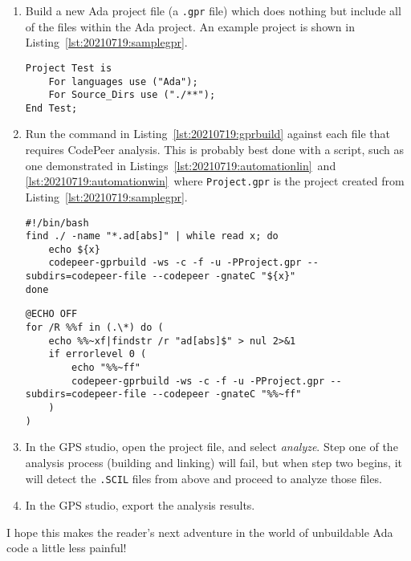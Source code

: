 \begin{enumerate}
	\item Build a new Ada project file (a \texttt{.gpr} file) which does nothing but include all of the files within the Ada project. An example project is shown in Listing~\ref{lst:20210719:samplegpr}.
\begin{lstlisting}[caption={All-Inclusive GPR Example},captionpos=b,style=AdaStyle,basicstyle=\small,label={lst:20210719:samplegpr},literate=*{-}{-}1,breaklines=true,upquote=true]
Project Test is
	For languages use ("Ada");
	For Source_Dirs use ("./**");
End Test;
\end{lstlisting}
	\item Run the command in Listing~\ref{lst:20210719:gprbuild} against each file that requires CodePeer analysis. This is probably best done with a script, such as one demonstrated in Listings~\ref{lst:20210719:automationlin}\ and \ref{lst:20210719:automationwin}\ where \texttt{Project.gpr} is the project created from Listing~\ref{lst:20210719:samplegpr}.
\begin{lstlisting}[caption={Bash Script for Ada Single-Build Automation},captionpos=b,style=BashStyle,basicstyle=\small,label={lst:20210719:automationlin},literate=*{-}{-}1
{"}{"}1,breaklines=true]
#!/bin/bash
find ./ -name "*.ad[abs]" | while read x; do
	echo ${x}
	codepeer-gprbuild -ws -c -f -u -PProject.gpr --subdirs=codepeer-file --codepeer -gnateC "${x}"
done
\end{lstlisting}
\begin{lstlisting}[caption={Batch Script for Ada Single-Build Automation},captionpos=b,style=BashStyle,basicstyle=\small,label={lst:20210719:automationwin},literate=*{-}{-}1
{"}{"}1,breaklines=true]
@ECHO OFF
for /R %%f in (.\*) do (
	echo %%~xf|findstr /r "ad[abs]$" > nul 2>&1
	if errorlevel 0 (
		echo "%%~ff"
		codepeer-gprbuild -ws -c -f -u -PProject.gpr --subdirs=codepeer-file --codepeer -gnateC "%%~ff"
	)
)
\end{lstlisting}
	\item In the GPS studio, open the project file, and select \textit{analyze}.  Step one of the analysis process (building and linking) will fail, but when step two begins, it will detect the \texttt{.SCIL} files from above and proceed to analyze those files.
	\item In the GPS studio, export the analysis results.
\end{enumerate}

I hope this makes the reader’s next adventure in the world of unbuildable Ada code a little less painful!
